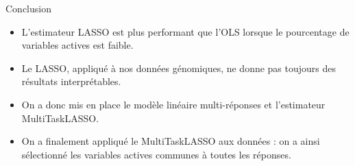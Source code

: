 \documentclass[8pt]{beamer}
\begin{document}
\begin{frame}{Conclusion}
\begin{block}{}
\begin{itemize}
\item {L'estimateur LASSO est plus performant que l'OLS lorsque le pourcentage de variables actives est faible.}
\item {Le LASSO, appliqué à nos données génomiques, ne donne pas toujours des résultats interprétables.}
\item {On a donc mis en place le modèle linéaire multi-réponses et l'estimateur MultiTaskLASSO.}
\item {On a finalement appliqué le MultiTaskLASSO aux données : on a ainsi sélectionné les variables actives communes à toutes les réponses.}
\end{itemize}
\end{block}
\end{frame}
\end{document}
